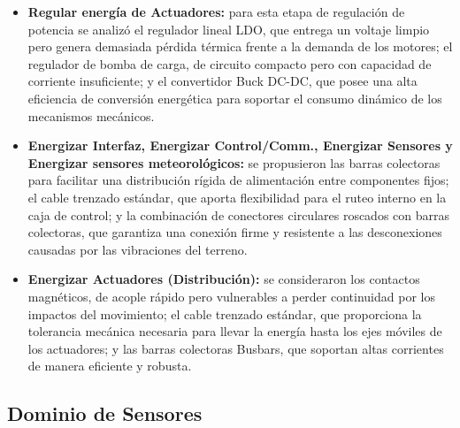 \documentclass[../../General.tex]{subfiles}
\begin{document}
\begin{itemize}
	\item \textbf{Regular energía de Actuadores:} para esta etapa de regulación de potencia se analizó el regulador lineal LDO, que entrega un voltaje limpio pero genera demasiada pérdida térmica frente a la demanda de los motores; el regulador de bomba de carga, de circuito compacto pero con capacidad de corriente insuficiente; y el convertidor Buck DC-DC, que posee una alta eficiencia de conversión energética para soportar el consumo dinámico de los mecanismos mecánicos.
	
	\item \textbf{Energizar Interfaz, Energizar Control/Comm., Energizar Sensores y Energizar sensores meteorológicos:} se propusieron las barras colectoras para facilitar una distribución rígida de alimentación entre componentes fijos; el cable trenzado estándar, que aporta flexibilidad para el ruteo interno en la caja de control; y la combinación de conectores circulares roscados con barras colectoras, que garantiza una conexión firme y resistente a las desconexiones causadas por las vibraciones del terreno.
	
	\item \textbf{Energizar Actuadores (Distribución):} se consideraron los contactos magnéticos, de acople rápido pero vulnerables a perder continuidad por los impactos del movimiento; el cable trenzado estándar, que proporciona la tolerancia mecánica necesaria para llevar la energía hasta los ejes móviles de los actuadores; y las barras colectoras Busbars, que soportan altas corrientes de manera eficiente y robusta.
\end{itemize}


\subsection{Dominio de Sensores}
\end{document}
